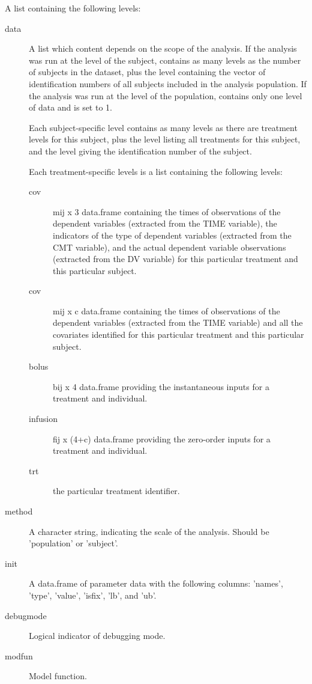 \begin{Arguments}
\begin{ldescription}
\item[\code{problem}] A list containing the following levels:\begin{description}

\item[data] A list which content depends on the scope of the analysis. If 
the analysis was run at the level of the subject,  contains as 
many levels as the number of subjects in the dataset, plus the 
level containing the vector of identification numbers of all subjects 
included in the analysis population. If the analysis was run at the level 
of the population,  contains only one level of data and 
 is set to 1.

Each subject-specific level contains as many levels as there are treatment
levels for this subject, plus the  level listing all treatments
for this subject, and the  level giving the identification number
of the subject. 

Each treatment-specific levels is a list containing the following levels: 
\begin{description}

\item[cov] mij x 3 data.frame containing the times of observations of the
dependent variables (extracted from the TIME variable), the indicators
of the type of dependent variables (extracted from the CMT variable),
and the actual dependent variable observations (extracted from the 
DV variable) for this particular treatment and this particular 
subject.
\item[cov] mij x c data.frame containing the times of observations of 
the dependent variables (extracted from the TIME variable) and all the
covariates identified for this particular treatment and this 
particular subject.
\item[bolus] bij x 4 data.frame providing the instantaneous inputs 
for a treatment and individual.
\item[infusion] fij x (4+c) data.frame providing the zero-order inputs for
a treatment and individual.
\item[trt] the particular treatment identifier.
\end{description}


\item[method] A character string, indicating the scale of the analysis. Should
be 'population' or 'subject'.
\item[init] A data.frame of parameter data with the following columns:
'names', 'type', 'value', 'isfix', 'lb', and 'ub'.
\item[debugmode] Logical indicator of debugging mode.
\item[modfun] Model function.


\end{description}
\end{ldescription}
\end{Arguments}
